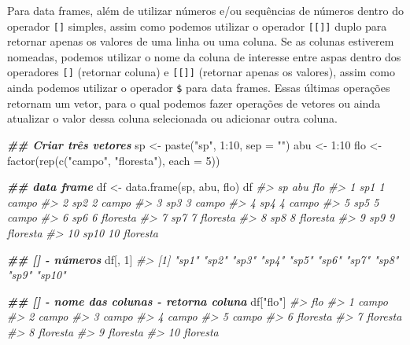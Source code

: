 \documentclass[
]{book}
\newenvironment{Shaded}{\begin{snugshade}}{\end{snugshade}}
\newcommand{\AttributeTok}[1]{\textcolor[rgb]{0.61,0.61,0.61}{#1}}
\newcommand{\CommentTok}[1]{\textcolor[rgb]{0.37,0.37,0.37}{\textit{#1}}}
\newcommand{\DecValTok}[1]{\textcolor[rgb]{0.06,0.06,0.06}{#1}}
\newcommand{\DocumentationTok}[1]{\textcolor[rgb]{0.37,0.37,0.37}{\textbf{\textit{#1}}}}
\newcommand{\FunctionTok}[1]{\textcolor[rgb]{0,0,0}{#1}}
\newcommand{\NormalTok}[1]{#1}
\newcommand{\OtherTok}[1]{\textcolor[rgb]{0.37,0.37,0.37}{#1}}
\newcommand{\SpecialCharTok}[1]{\textcolor[rgb]{0,0,0}{#1}}
\newcommand{\StringTok}[1]{\textcolor[rgb]{0.5,0.5,0.5}{#1}}
\begin{document}
Para data frames, além de utilizar números e/ou sequências de números dentro do operador \texttt{{[}{]}} simples, assim como podemos utilizar o operador \texttt{{[}{[}{]}{]}} duplo para retornar apenas os valores de uma linha ou uma coluna. Se as colunas estiverem nomeadas, podemos utilizar o nome da coluna de interesse entre aspas dentro dos operadores \texttt{{[}{]}} (retornar coluna) e \texttt{{[}{[}{]}{]}} (retornar apenas os valores), assim como ainda podemos utilizar o operador \texttt{\$} para data frames. Essas últimas operações retornam um vetor, para o qual podemos fazer operações de vetores ou ainda atualizar o valor dessa coluna selecionada ou adicionar outra coluna.

\begin{Shaded}
\begin{Highlighting}[]
\DocumentationTok{\#\# Criar três vetores}
\NormalTok{sp }\OtherTok{\textless{}{-}} \FunctionTok{paste}\NormalTok{(}\StringTok{"sp"}\NormalTok{, }\DecValTok{1}\SpecialCharTok{:}\DecValTok{10}\NormalTok{, }\AttributeTok{sep =} \StringTok{""}\NormalTok{)}
\NormalTok{abu }\OtherTok{\textless{}{-}} \DecValTok{1}\SpecialCharTok{:}\DecValTok{10}
\NormalTok{flo }\OtherTok{\textless{}{-}} \FunctionTok{factor}\NormalTok{(}\FunctionTok{rep}\NormalTok{(}\FunctionTok{c}\NormalTok{(}\StringTok{"campo"}\NormalTok{, }\StringTok{"floresta"}\NormalTok{), }\AttributeTok{each =} \DecValTok{5}\NormalTok{))}

\DocumentationTok{\#\# data frame}
\NormalTok{df }\OtherTok{\textless{}{-}} \FunctionTok{data.frame}\NormalTok{(sp, abu, flo)}
\NormalTok{df}
\CommentTok{\#\textgreater{}      sp abu      flo}
\CommentTok{\#\textgreater{} 1   sp1   1    campo}
\CommentTok{\#\textgreater{} 2   sp2   2    campo}
\CommentTok{\#\textgreater{} 3   sp3   3    campo}
\CommentTok{\#\textgreater{} 4   sp4   4    campo}
\CommentTok{\#\textgreater{} 5   sp5   5    campo}
\CommentTok{\#\textgreater{} 6   sp6   6 floresta}
\CommentTok{\#\textgreater{} 7   sp7   7 floresta}
\CommentTok{\#\textgreater{} 8   sp8   8 floresta}
\CommentTok{\#\textgreater{} 9   sp9   9 floresta}
\CommentTok{\#\textgreater{} 10 sp10  10 floresta}

\DocumentationTok{\#\# [] {-} números}
\NormalTok{df[, }\DecValTok{1}\NormalTok{]}
\CommentTok{\#\textgreater{}  [1] "sp1"  "sp2"  "sp3"  "sp4"  "sp5"  "sp6"  "sp7"  "sp8"  "sp9"  "sp10"}

\DocumentationTok{\#\# [] {-} nome das colunas {-} retorna coluna}
\NormalTok{df[}\StringTok{"flo"}\NormalTok{]}
\CommentTok{\#\textgreater{}         flo}
\CommentTok{\#\textgreater{} 1     campo}
\CommentTok{\#\textgreater{} 2     campo}
\CommentTok{\#\textgreater{} 3     campo}
\CommentTok{\#\textgreater{} 4     campo}
\CommentTok{\#\textgreater{} 5     campo}
\CommentTok{\#\textgreater{} 6  floresta}
\CommentTok{\#\textgreater{} 7  floresta}
\CommentTok{\#\textgreater{} 8  floresta}
\CommentTok{\#\textgreater{} 9  floresta}
\CommentTok{\#\textgreater{} 10 floresta}


\end{Highlighting}
\end{Shaded}
\end{document}
